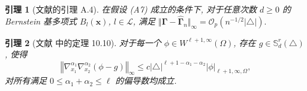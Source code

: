 \documentclass[a4paper,openay,14pt]{ctexbook}
\newtheorem{lem}{引理}
\numberwithin{equation}{section}
\numberwithin{lem}{section}
\begin{document}
\begin{lem}[文献\cite{yu2019estimation}的引理 A.4]\label{Lemma:Gamma-Gammahat}
在假设 (A7) 成立的条件下, 对于任意次数 \( d \geq 0 \) 的 Bernstein 基多项式 \( B_l(\boldsymbol{x}) \),  \( l \in \mathcal{L} \), 满足
\(\Vert \bm{\Gamma} - \hat{\bm{\Gamma}}_{n} \Vert_{\infty} = \mathcal{O}_p\left(n^{-1/2} |\triangle|\right).\)
\end{lem}

\begin{lem}[文献 \cite{lai2007spline} 中的定理 10.10]\label{Lemma:phi-g}
    对于每一个 $\phi\in W^{\ell+1,\infty}(\Omega)$, 存在 $g\in\mathbb{S}_d^r(\triangle)$, 使得 
    $$\left\Vert \nabla_{x_1}^{\alpha_1}\nabla_{x_2}^{\alpha_2}(\phi-g)\right\Vert_{\infty}\leq c\vert \triangle\vert^{\ell+1-\alpha_1-\alpha_2}\vert \phi\vert_{\ell+1,\infty,\Omega},$$
    对所有满足 $0\leq \alpha_1+\alpha_2\leq \ell$ 的偏导数均成立.
\end{lem}
\end{document}
